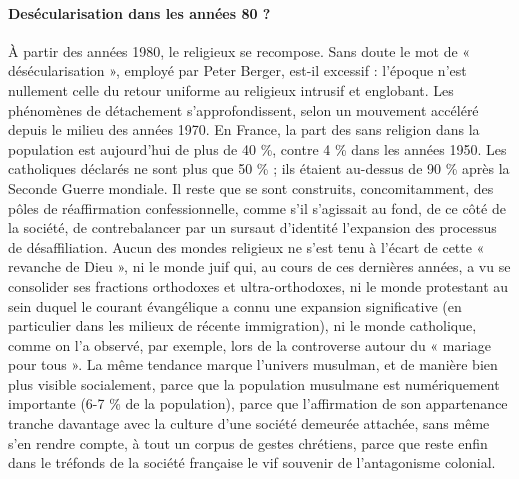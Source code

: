 \paragraph{Desécularisation dans les années 80 ?}À partir des années 1980, le religieux se recompose. Sans doute le mot de « désécularisation », employé par Peter Berger, est-il excessif : l’époque n’est nullement celle du retour uniforme au religieux intrusif et englobant. Les phénomènes de détachement s’approfondissent, selon un mouvement accéléré depuis le milieu des années 1970. En France, la part des sans religion dans la population est aujourd’hui de plus de 40 \%, contre 4 \% dans les années 1950. Les catholiques déclarés ne sont plus que 50 \% ; ils étaient au-dessus de 90 \% après la Seconde Guerre mondiale. Il reste que se sont construits, concomitamment, des pôles de réaffirmation confessionnelle, comme s’il s’agissait au fond, de ce côté de la société, de contrebalancer par un sursaut d’identité l’expansion des processus de désaffiliation. Aucun des mondes religieux ne s’est tenu à l’écart de cette
« revanche de Dieu », ni le monde juif qui, au cours de ces dernières années, a vu se consolider ses fractions orthodoxes et ultra-orthodoxes, ni le monde protestant au sein duquel le courant évangélique a connu une expansion significative (en particulier dans les milieux de récente immigration), ni le monde catholique, comme on l’a observé, par exemple, lors de la controverse autour du « mariage pour tous ». La même tendance marque l’univers musulman, et de manière bien plus visible socialement, parce que la population musulmane est numériquement importante (6-7 \% de la population), parce que l’affirmation de son appartenance tranche davantage avec la culture d’une société demeurée attachée, sans même s’en rendre compte, à tout un corpus de gestes chrétiens, parce que reste enfin dans le tréfonds de la société française le vif souvenir de l’antagonisme colonial.
